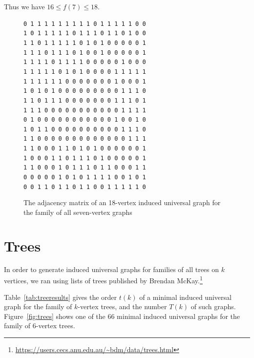 \documentclass[12pt]{article}
\begin{document}
Thus we have $16 \leq f(7) \leq 18$.

\begin{figure}[htb]
\centering
\footnotesize
\verb|0 1 1 1 1 1 1 1 1 1 0 1 1 1 1 1 0 0| \\
\verb|1 0 1 1 1 1 1 0 1 1 1 0 1 1 0 1 0 0| \\
\verb|1 1 0 1 1 1 1 1 0 1 0 1 0 0 0 0 0 1| \\
\verb|1 1 1 0 1 1 1 0 1 0 0 1 0 0 0 0 0 1| \\
\verb|1 1 1 1 0 1 1 1 1 0 0 0 0 0 1 0 0 0| \\
\verb|1 1 1 1 1 0 1 0 1 0 0 0 0 1 1 1 1 1| \\
\verb|1 1 1 1 1 1 0 0 0 0 0 0 0 1 0 0 0 1| \\
\verb|1 0 1 0 1 0 0 0 0 0 0 0 0 0 1 1 1 0| \\
\verb|1 1 0 1 1 1 0 0 0 0 0 0 0 1 1 1 0 1| \\
\verb|1 1 1 0 0 0 0 0 0 0 0 0 0 0 1 1 1 1| \\
\verb|0 1 0 0 0 0 0 0 0 0 0 0 0 1 0 0 1 0| \\
\verb|1 0 1 1 0 0 0 0 0 0 0 0 0 0 1 1 1 0| \\
\verb|1 1 0 0 0 0 0 0 0 0 0 0 0 0 0 1 1 1| \\
\verb|1 1 0 0 0 1 1 0 1 0 1 0 0 0 0 0 0 1| \\
\verb|1 0 0 0 1 1 0 1 1 1 0 1 0 0 0 0 0 1| \\
\verb|1 1 0 0 0 1 0 1 1 1 0 1 1 0 0 0 1 1| \\
\verb|0 0 0 0 0 1 0 1 0 1 1 1 1 0 0 1 0 1| \\
\verb|0 0 1 1 0 1 1 0 1 1 0 0 1 1 1 1 1 0|
\caption{The adjacency matrix of an 18-vertex induced universal graph for the family of all
seven-vertex graphs}
\label{fig:adjmat18}
\end{figure}

\section{Trees}\label{sec:trees}

In order to generate induced universal graphs for families of
all trees on $k$ vertices, we ran 
using lists of trees published by Brendan
McKay.\footnote{\url{https://users.cecs.anu.edu.au/~bdm/data/trees.html}}

Table~\ref{tab:treeresults} gives the order $t(k)$ of a minimal induced universal graph for
the family of $k$-vertex trees, and the number $T(k)$ of such graphs.  Figure~\ref{fig:trees}
shows one of the 66 minimal induced universal graphs for the family of 6-vertex trees.
\end{document}
